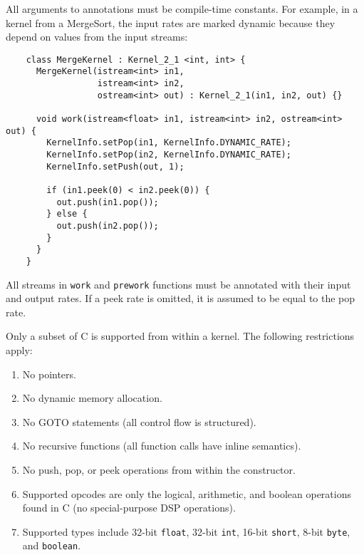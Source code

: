 All arguments to annotations must be compile-time constants.  For
example, in a kernel from a MergeSort, the input rates are marked
dynamic because they depend on values from the input streams:
{\small
\begin{verbatim}
    class MergeKernel : Kernel_2_1 <int, int> {
      MergeKernel(istream<int> in1, 
                  istream<int> in2, 
                  ostream<int> out) : Kernel_2_1(in1, in2, out) {}

      void work(istream<float> in1, istream<int> in2, ostream<int> out) {
        KernelInfo.setPop(in1, KernelInfo.DYNAMIC_RATE);
        KernelInfo.setPop(in2, KernelInfo.DYNAMIC_RATE);
        KernelInfo.setPush(out, 1);

        if (in1.peek(0) < in2.peek(0)) {
          out.push(in1.pop());
        } else {
          out.push(in2.pop());
        }
      }
    }  
\end{verbatim}}

All streams in {\tt work} and {\tt prework} functions must be
annotated with their input and output rates.  If a peek rate is
omitted, it is assumed to be equal to the pop rate.


Only a subset of C is supported from within a kernel.  The following
restrictions apply:

\begin{enumerate}

\item No pointers.

\item No dynamic memory allocation.

\item No GOTO statements (all control flow is structured).

\item No recursive functions (all function calls have inline
semantics).

\item No push, pop, or peek operations from within the constructor.

\item Supported opcodes are only the logical, arithmetic, and boolean
operations found in C (no special-purpose DSP operations).

\item Supported types include 32-bit {\tt float}, 32-bit {\tt int},
16-bit {\tt short}, 8-bit {\tt byte}, and {\tt boolean}.

\end{enumerate}

